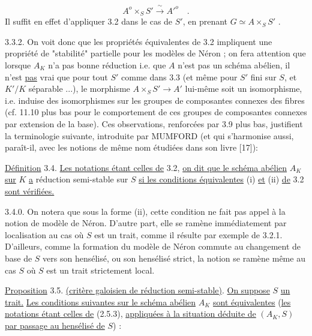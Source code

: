 \begin{equation}\tag{3.3.1}
A^o \times_S S' \xrightarrow{\ \sim\ } {A'}^{o} \quad .
\end{equation}
Il suffit en effet d'appliquer 3.2 dans le cas de $S'$, en prenant $G \simeq A \times_S S'$ .



3.3.2. On voit donc que les propriétés équivalentes de 3.2 impliquent une propriété de "stabilité" partielle pour les modèles de Néron ; on fera attention que lorsque $A_K$ n'a pas bonne réduction i.e. que $A$ n'est pas un schéma abélien, il n'est \underline{pas} vrai que pour tout $S'$ comme dans 3.3 (et même pour $S'$ fini sur $S$, et $K'/K$ séparable ...), le morphisme $A \times_S S' \longrightarrow A'$ lui-même soit un isomorphisme, i.e. induise des isomorphismes sur les groupes de composantes connexes des fibres (cf. 11.10 plus bas pour le comportement de ces groupes de composantes connexes par extension de la base). Ces observations, renforcées par 3.9 plus bas, justifient la terminologie suivante, introduite par MUMFORD (et qui s'harmonise aussi, paraît-il, avec les notions de même nom étudiées dans son livre [17]):

\underline{Définition} 3.4. \underline{Les notations étant celles de} 3.2, \underline{on dit que le schéma abélien} $A_K$ \underline{sur} $K$ \underline{a} réduction semi-stable sur $S$ \underline{si les conditions équivalentes} (i) \underline{et} (ii) \underline{de} 3.2 \underline{sont vérifiées.}

3.4.0. On notera que sous la forme (ii), cette condition ne fait pas appel à la notion de modèle de Néron. D'autre part, elle se ramène immédiatement par localisation au cas où $S$ est un trait, comme il résulte par exemple de 3.2.1. D'ailleurs, comme la formation du modèle de Néron commute au changement de base de $S$ vers son hensélisé, ou son hensélisé strict, la notion se ramène même au cas $S$ où $S$ est un trait strictement local.



\underline{Proposition} 3.5. \underline{(critère galoisien de réduction semi-stable)}. \underline{On suppose} $S$ \underline{un trait.} \underline{Les conditions suivantes sur le schéma abélien} $A_K$ \underline{sont équivalentes} (\underline{les notations étant celles de} (2.5.3), \underline{appliquées à la situation déduite de} $(A_K,S)$ \underline{par passage au hensélisé de} $S$) :

